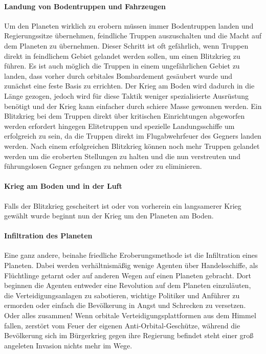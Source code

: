 \documentclass[11pt, a4paper]{article}
\begin{document}
\paragraph{Landung von Bodentruppen und Fahrzeugen}
Um den Planeten wirklich zu erobern müssen immer Bodentruppen landen und Regierungssitze übernehmen, 
feindliche Truppen auszuschalten und die Macht auf dem Planeten zu übernehmen. Dieser Schritt ist oft 
gefährlich, wenn Truppen direkt in feindlichem Gebiet gelandet werden sollen, um einen Blitzkrieg zu führen.
Es ist auch möglich die Truppen in einem ungefährlichen Gebiet zu landen, dass vorher durch orbitales 
Bombardement gesäubert wurde und zunächst eine feste Basis zu errichten. Der Krieg am Boden wird dadurch in
die  Länge gezogen, jedoch wird für diese Taktik weniger spezialisierte Ausrüstung benötigt und der Krieg kann
einfacher durch schiere Masse gewonnen werden. Ein Blitzkrieg bei dem Truppen direkt über kritischen 
Einrichtungen abgeworfen werden erfordert hingegen Elitetruppen und spezielle Landungsschiffe um erfolgreich 
zu sein, da die Truppen direkt im Flugabwehrfeuer des Gegners landen werden. Nach einem erfolgreichen 
Blitzkrieg können noch mehr Truppen gelandet werden um die eroberten Stellungen zu halten und die nun 
verstreuten und führungslosen Gegner gefangen zu nehmen oder zu eliminieren.
%
\paragraph{Krieg am Boden und in der Luft}
Falls der Blitzkrieg gescheitert ist oder von vorherein ein langsamerer Krieg gewählt wurde beginnt nun der 
Krieg um den Planeten am Boden.
%
\paragraph{Infiltration des Planeten}
Eine ganz andere, beinahe friedliche Eroberungsmethode ist die Infiltration eines Planeten. Dabei werden 
verhältnismäßig wenige Agenten über Handelsschiffe, als Flüchtlinge getarnt oder auf anderen Wegen auf einen 
Planeten gebracht. Dort beginnen die Agenten entweder eine Revolution auf dem Planeten einzuläuten, die 
Verteidigungsanlagen zu sabotieren, wichtige Politiker und Anführer zu ermorden oder einfach die Bevölkerung 
in Angst und Schrecken zu versetzen. Oder alles zusammen! Wenn orbitale Verteidigungsplattformen aus dem 
Himmel fallen, zerstört vom Feuer der eigenen Anti-Orbital-Geschütze, während die Bevölkerung sich im 
Bürgerkrieg gegen ihre Regierung befindet steht einer groß angeleten Invasion nichts mehr im Wege. 
%
\end{document}
